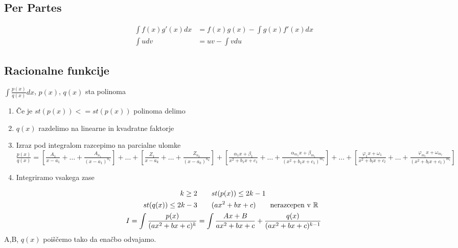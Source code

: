 \documentclass[a4paper,oneside,10pt]{article}
\theoremstyle{definition}
\newcommand{\R}{\ensuremath{\mathbb{R}}}
\renewcommand{\phi}{\varphi}
\newcommand\ogl[1]{\left[#1\right]}
\begin{document}
\begin{multicols}{2}
\begin{tabular}[h]{|c|c|}
		\hline 

	\end{tabular}
%
	\subsection*{Per Partes}
	\begin{align*}
		\int f(x)g'(x)dx &= f(x)g(x) - \int g(x)f'(x)dx\\
		\int udv &= uv - \int vdu
	\end{align*}
	\subsection*{Racionalne funkcije}
	$\int\frac{p(x)}{q(x)}dx$, \qquad $p(x)$, $q(x)$ sta polinoma
	\begin{enumerate}
		\item Če je $st(p(x)) <= st(p(x))$ polinoma delimo
		\item $q(x)$ razdelimo na linearne in kvadratne faktorje
		\item Izraz pod integralom razcepimo na parcialne ulomke\\
		$\frac{p(x)}{q(x)} = \ogl{\frac{A_1}{x-a_1} + \dots + \frac{A_{n_1}}{(x-a_1)^{{n_1}}} } + \dots +
		\ogl{\frac{Z_1}{x-a_k}+ \dots + \frac{Z_{n_k}}{(x-a_k)^{{n_k}}} } + 
		\ogl{\frac{\alpha_1x + \beta_1}{x^2 + b_1x + c_1} + \dots + \frac{\alpha_{m_1}x + \beta_{m_1}}{(x^2 + b_1x +c_1)^{m_1}} } + \dots + 
		\ogl{\frac{\phi_1x + \omega_1}{x^2 + b_lx + c_l} + \dots + \frac{\phi_{m_l}x + \omega_{m_l}}{(x^2 + b_lx +c_l)^{m_l}} }$
		\item Integriramo vsakega zase
	\end{enumerate}
%	
	\begin{align*}
		k \geq 2 & \qquad st(p(x)) \leq 2k - 1\\
		st(q(x)) \leq 2k - 3 & \qquad (ax^2 + bx + c) \qquad \text{nerazcepen v \R}\\
		I = \int \frac{p(x)}{(ax^2 + bx + c)^k} &= \int \frac{Ax+B}{ax^2 + bx + c} + \frac{q(x)}{(ax^2 + bx + c)^{k-1}}
	\end{align*}
	A,B, $q(x)$ poiščemo tako da enačbo odvajamo.

\end{multicols}
\end{document}
